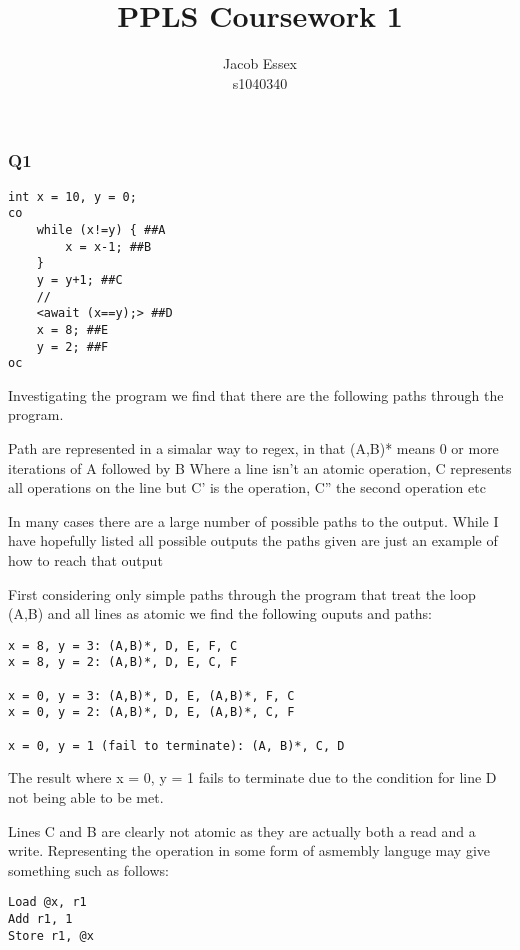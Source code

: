 \documentclass[11pt,a4paper]{article}
\begin{document}
\title{PPLS Coursework 1}
\author{Jacob Essex\\s1040340}
\maketitle

\subsubsection*{Q1}

\begin{verbatim}
int x = 10, y = 0;
co
    while (x!=y) { ##A
        x = x-1; ##B
    }
    y = y+1; ##C
    //
    <await (x==y);> ##D
    x = 8; ##E
    y = 2; ##F
oc
\end{verbatim}

Investigating the program we find that there are the following paths
through the program.

Path are represented in a simalar way to regex, in that (A,B)* means 0
or more iterations of A followed by B Where a line isn't an atomic
operation, C represents all operations on the line but C' is the
operation, C'' the second operation etc

In many cases there are a large number of possible paths to the output.
While I have hopefully listed all possible outputs the paths given are
just an example of how to reach that output

First considering only simple paths through the program that treat the
loop (A,B) and all lines as atomic we find the following ouputs and
paths:

\begin{verbatim}
x = 8, y = 3: (A,B)*, D, E, F, C
x = 8, y = 2: (A,B)*, D, E, C, F

x = 0, y = 3: (A,B)*, D, E, (A,B)*, F, C
x = 0, y = 2: (A,B)*, D, E, (A,B)*, C, F

x = 0, y = 1 (fail to terminate): (A, B)*, C, D
\end{verbatim}

The result where x = 0, y = 1 fails to terminate due to the condition
for line D not being able to be met.

Lines C and B are clearly not atomic as they are actually both a read
and a write. Representing the operation in some form of asmembly languge
may give something such as follows:

\begin{verbatim}
Load @x, r1
Add r1, 1
Store r1, @x
\end{verbatim}
\end{document}
